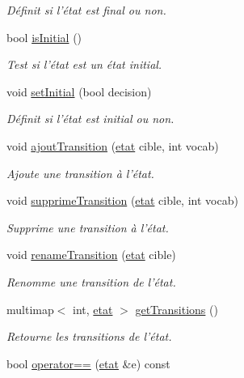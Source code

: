 \begin{DoxyCompactItemize}
\begin{DoxyCompactList}\small\item\em Définit si l'état est final ou non. \end{DoxyCompactList}\item 
bool \hyperlink{classetat_a6993bd53bfd754392515e4ef5772fcdc}{is\-Initial} ()
\begin{DoxyCompactList}\small\item\em Test si l'état est un état initial. \end{DoxyCompactList}\item 
void \hyperlink{classetat_aa30d0693cce29763ec555e103d7fda11}{set\-Initial} (bool decision)
\begin{DoxyCompactList}\small\item\em Définit si l'état est initial ou non. \end{DoxyCompactList}\item 
void \hyperlink{classetat_a9a6aec9a31e666ae17dd7fefcad18211}{ajout\-Transition} (\hyperlink{classetat}{etat} cible, int vocab)
\begin{DoxyCompactList}\small\item\em Ajoute une transition à l'état. \end{DoxyCompactList}\item 
void \hyperlink{classetat_a5cbda5ddad6a28b2d7f7458defd5d472}{supprime\-Transition} (\hyperlink{classetat}{etat} cible, int vocab)
\begin{DoxyCompactList}\small\item\em Supprime une transition à l'état. \end{DoxyCompactList}\item 
void \hyperlink{classetat_a164b80c240d038739bfea098c0499928}{rename\-Transition} (\hyperlink{classetat}{etat} cible)
\begin{DoxyCompactList}\small\item\em Renomme une transition de l'état. \end{DoxyCompactList}\item 
multimap$<$ int, \hyperlink{classetat}{etat} $>$ \hyperlink{classetat_acc168f9b970e301d65e72cf1f4ee9062}{get\-Transitions} ()
\begin{DoxyCompactList}\small\item\em Retourne les transitions de l'état. \end{DoxyCompactList}\item 
bool \hyperlink{classetat_a3d26c7ad12fb95b34e6ec2a44cdf0214}{operator==} (\hyperlink{classetat}{etat} \&e) const 

\end{DoxyCompactItemize}
